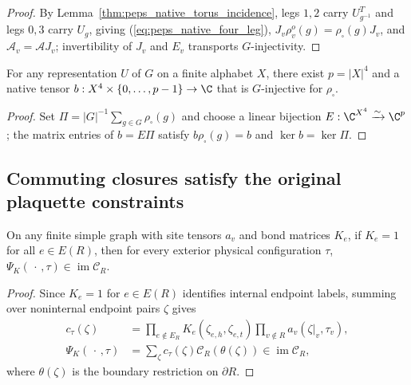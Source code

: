 \begin{proof}\leanok
    By Lemma~\ref{thm:peps_native_torus_incidence}, legs $1,2$ carry
    $U_{g^{-1}}^T$ and legs $0,3$ carry $U_g$, giving
    (\ref{eq:peps_native_four_leg}), $J_v\rho_v^o(g)=\rho_\square(g)J_v$, and
    $\mathcal A_v=\mathcal A J_v$; invertibility of $J_v$ and $E_v$ transports
    $G$-injectivity.
\end{proof}

\begin{lemma}%
    \label{thm:peps_native_averaging_site}
    \leanok
    For any representation $U$ of $G$ on a finite alphabet $X$, there exist
    $p=|X|^4$ and a native tensor $b:X^4\times\{0,\ldots,p-1\}\to\C$ that is
    $G$-injective for $\rho_\square$.
\end{lemma}
\begin{proof}\leanok
    Set $\Pi=|G|^{-1}\sum_{g\in G}\rho_\square(g)$ and choose a linear bijection
    $E:\C^{X^4}\xrightarrow{\sim}\C^p$; the matrix entries of $b=E\Pi$ satisfy
    $b\rho_\square(g)=b$ and $\ker b=\ker\Pi$.
\end{proof}

\subsection{Commuting closures satisfy the original plaquette constraints}

\begin{lemma}%
    \label{thm:peps_native_inserted_region_support}
    \leanok
    On any finite simple graph with site tensors $a_v$ and bond matrices $K_e$,
    if $K_e=1$ for all $e\in E(R)$, then for every exterior physical
    configuration $\tau$, $\Psi_K(\,\cdot\,,\tau)\in\operatorname{im}\mathcal C_R$.
\end{lemma}
\begin{proof}\leanok
    Since $K_e=1$ for $e\in E(R)$ identifies internal endpoint labels, summing
    over noninternal endpoint pairs $\zeta$ gives
    \begin{align}
        c_\tau(\zeta)
         & =\prod_{e\notin E_R}K_e(\zeta_{e,h},\zeta_{e,t})
        \prod_{v\notin R}a_v(\zeta|_v,\tau_v),
        \label{eq:peps_native_inserted_exterior}            \\
        \Psi_K(\,\cdot\,,\tau)
         & =\sum_\zeta c_\tau(\zeta)
        \mathcal C_R(\theta(\zeta))\in\operatorname{im}\mathcal C_R,
        \label{eq:peps_native_inserted_slice}
    \end{align}
    where $\theta(\zeta)$ is the boundary restriction on $\partial R$.
\end{proof}

